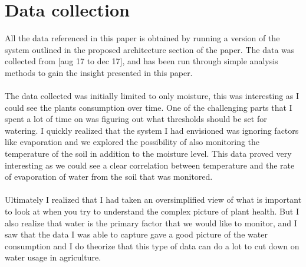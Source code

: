 \documentclass[]{uiophd}
\begin{document}
\section{Data collection}
All the data referenced in this paper is obtained by running a version of the system outlined in the proposed architecture section of the paper. The data was collected from [aug 17 to dec 17], and has been run through simple analysis methods to gain the insight presented in this paper.
\\\\
The data collected was initially limited to only moisture, this was interesting as I could see the plants consumption over time. One of the challenging parts that I spent a lot of time on was figuring out what thresholds should be set for watering. I quickly realized that the system I had envisioned was ignoring factors like evaporation and we explored the possibility of also monitoring the temperature of the soil in addition to the moisture level. This data proved very interesting as we could see a clear correlation between temperature and the rate of evaporation of water from the soil that was monitored.
\\\\
Ultimately I realized that I had taken an oversimplified view of what is important to look at when you try to understand the complex picture of plant health. But I also realize that water is the primary factor that we would like to monitor, and I saw that the data I was able to capture gave a good picture of the water consumption and I do theorize that this type of data can do a lot to cut down on water usage in agriculture.
\end{document}

